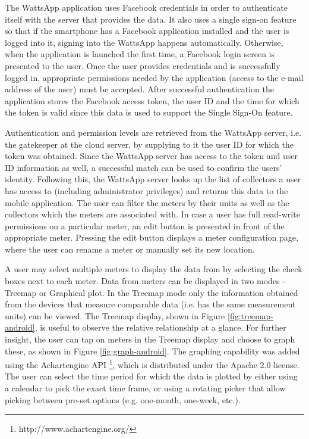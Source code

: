 \documentclass[10pt, conference, compsocconf, english]{IEEEtran}
\begin{document}
The WattsApp application uses Facebook credentials in order to authenticate
itself with the server that provides the data. It also uses a single
sign-on feature so that if the smartphone has a Facebook application
installed and the user is logged into it, signing into the WattsApp
happens automatically. Otherwise, when the application is launched
the first time, a Facebook login screen is presented to the user.
Once the user provides credentials and is successfully logged in,
appropriate permissions needed by the application (access to the e-mail
address of the user) must be accepted. After successful authentication
the application stores the Facebook access token, the user ID and
the time for which the token is valid since this data is used to support
the Single Sign-On feature.

Authentication and permission levels are retrieved from the WattsApp
server, i.e. the gatekeeper at the cloud server, by supplying to it
the user ID for which the token was obtained. Since the WattsApp server
has access to the token and user ID information as well, a successful
match can be used to confirm the users' identity. Following this,
the WattsApp server looks up the list of collectors a user has access
to (including administrator privileges) and returns this data to the
mobile application. The user can filter the meters by their units
as well as the collectors which the meters are associated with. In
case a user has full read-write permissions on a particular meter,
an edit button is presented in front of the appropriate meter. Pressing
the edit button displays a meter configuration page, where the user
can rename a meter or manually set its new location.

\vskip 1.37cm
\pagebreak
 
A user may select multiple meters to display the data from
by selecting the check boxes next to each meter. Data from meters can
be displayed in two modes - Treemap or Graphical plot. In the Treemap mode
only the information obtained from the devices that measure comparable
data (i.e. has the same measurement units) can be viewed. The Treemap
display, shown in Figure \ref{fig:treemap-android}, is useful to
observe the relative relationship at a glance. For further insight,
the user can tap on meters in the Treemap display and choose to graph
these, as shown in Figure \ref{fig:graph-android}. The graphing capability
was added using the Achartengine API%
\footnote{http://www.achartengine.org/%
}, which is distributed under the Apache 2.0 license. The user can 
select the time period for which the data is plotted by either
using a calendar to pick the exact time frame, or using a rotating
picker that allow picking between pre-set options (e.g. one-month,
one-week, etc.).
\end{document}
